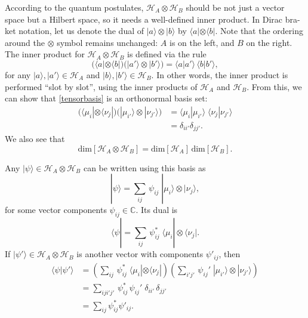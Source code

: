 \documentclass[pra,12pt]{revtex4}
\begin{document}
According to the quantum postulates, $\mathscr{H}_A\otimes
\mathscr{H}_B$ should be not just a vector space but a Hilbert space,
so it needs a well-defined inner product.  In Dirac bra-ket notation,
let us denote the dual of $|a\rangle\otimes|b\rangle$ by $\langle a|
\otimes \langle b|$.  Note that the ordering around the $\otimes$
symbol remains unchanged: $A$ is on the left, and $B$ on the right.
The inner product for $\mathscr{H}_A\otimes \mathscr{H}_B$ is defined
via the rule
\begin{equation}
  \Big(\langle a| \otimes \langle b| \Big)
  \Big(| a'\rangle \otimes |b'\rangle \Big) = \langle a|a'\rangle\,
  \langle b|b'\rangle,
  \label{innerprod}
\end{equation}
for any $|a\rangle, |a'\rangle \in \mathscr{H}_A$ and $|b\rangle,
|b'\rangle \in \mathscr{H}_B$.  In other words, the inner product is
performed ``slot by slot'', using the inner products of
$\mathscr{H}_A$ and $\mathscr{H}_B$.  From this, we can show that
\eqref{tensorbasis} is an orthonormal basis set:
\begin{align}
  \Big( \langle\mu_i| \otimes \langle\nu_j|\Big)
  \Big( |\mu_{i'}\rangle \otimes |\nu_{j'}\rangle\Big)
  &= \langle \mu_i|\mu_{i'}\rangle \;
  \langle \nu_j|\nu_{j'}\rangle \\
  &= \delta_{ii'}\delta_{jj'}.  
\end{align}
We also see that
\begin{equation}
  \mathrm{dim}\left[\mathscr{H}_A\otimes
  \mathscr{H}_B\right] = \mathrm{dim}\left[\mathscr{H}_A\right] \,
  \mathrm{dim}\left[\mathscr{H}_B\right].
\end{equation}

Any $|\psi\rangle \in \mathscr{H}_A\otimes \mathscr{H}_B$ can be
written using this basis as
\begin{equation}
  |\psi\rangle = \sum_{ij} \, \psi_{ij}\; |\mu_i\rangle \otimes |\nu_j\rangle,
  \label{psispan}
\end{equation}
for some vector components $\psi_{ij}\in\mathbb{C}$.  Its dual is
\begin{equation}
  \langle \psi| = \sum_{ij} \, \psi_{ij}^*\; \langle\mu_i| \otimes \langle\nu_j|.
\end{equation}
If $|\psi'\rangle \in \mathscr{H}_A \otimes \mathscr{H}_B$ is another
vector with components $\psi'_{ij}$, then
\begin{align}
  \langle \psi| \psi'\rangle &=
  \left(\sum_{ij} \, \psi_{ij}^*\; \langle\mu_i| \otimes \langle\nu_j|\right)
  \left(\sum_{i'j'} \, \psi_{ij}'\; |\mu_{i'}\rangle \otimes |\nu_{j'}\rangle\right) \\
  &=\sum_{iji'j'} \, \psi_{ij}^*\, \psi_{ij}' \; \delta_{ii'} \, \delta_{jj'} \\
  &= \sum_{ij} \psi_{ij}^* \psi'_{ij}.
\end{align}
\end{document}
